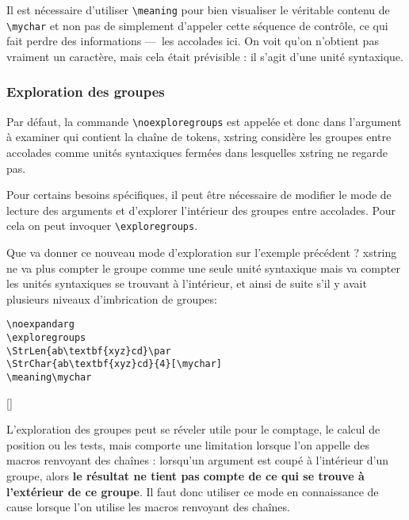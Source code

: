 \documentclass[a4paper,10pt]{article}
\newcommand\guill[1]{\og{}#1\fg{}}
\newcommand\US{unité syntaxique\xspace}
\newcommand\USs{unités syntaxiques\xspace}
\newcommand\Xstring{\textsf{xstring}\xspace}
\newcommand\styleexercice{\footnotesize}
\newcommand\verbinline{\lstinline[basicstyle=\normalsize\ttfamily]}
\begin{document}
Il est nécessaire d'utiliser \verb|\meaning| pour bien visualiser le véritable contenu de \verb|\mychar| et non pas de simplement d'appeler cette séquence de contrôle, ce qui fait perdre des informations ---~les accolades ici. On voit qu'on n'obtient pas vraiment un \guill{caractère}, mais cela était prévisible : il s'agit d'une \US.

\subsubsection{Exploration des groupes}
Par défaut, la commande \verbinline|\noexploregroups| est appelée et donc dans l'argument à examiner qui contient la chaîne de tokens, \Xstring considère les groupes entre accolades comme \USs fermées dans lesquelles \Xstring ne regarde pas.

Pour certains besoins spécifiques, il peut être nécessaire de modifier le mode de lecture des arguments et d'explorer l'intérieur des groupes entre accolades. Pour cela on peut invoquer \verbinline|\exploregroups|.\medskip

Que va donner ce nouveau mode d'exploration sur l'exemple précédent ? \Xstring ne va plus compter le groupe comme une seule \US mais va compter les \USs se trouvant à l'intérieur, et ainsi de suite s'il y avait plusieurs niveaux d'imbrication de groupes:

\nobreak\smallskip
\begin{minipage}[c]{0.65\linewidth}
\begin{lstlisting}
\noexpandarg
\exploregroups
\StrLen{ab\textbf{xyz}cd}\par
\StrChar{ab\textbf{xyz}cd}{4}[\mychar]
\meaning\mychar
\end{lstlisting}%
\end{minipage}\hfill
\begin{minipage}[c]{0.35\linewidth}
	\styleexercice
	\noexpandarg
	\exploregroups
	\par
	[\mychar]
	\meaning\mychar
\end{minipage}%
\fullexpandarg\noexploregroups
\medskip

L'exploration des groupes peut se réveler utile pour le comptage, le calcul de position ou les tests, mais comporte une limitation lorsque l'on appelle des macros renvoyant des chaînes : lorsqu'un argument est coupé à l'intérieur d'un groupe, alors \textbf{le résultat ne tient pas compte de ce qui se trouve à l'extérieur de ce groupe}. Il faut donc utiliser ce mode en connaissance de cause lorsque l'on utilise les macros renvoyant des chaînes.
\end{document}

